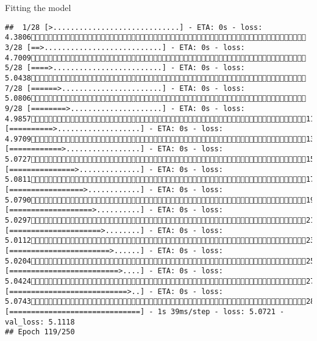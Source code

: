 \documentclass[
  ignorenonframetext,
]{beamer}
\begin{document}
\begin{frame}[fragile]{Fitting the model}
\begin{verbatim}
##  1/28 [>.............................] - ETA: 0s - loss: 4.3806 3/28 [==>...........................] - ETA: 0s - loss: 4.7009 5/28 [====>.........................] - ETA: 0s - loss: 5.0438 7/28 [======>.......................] - ETA: 0s - loss: 5.0806 9/28 [========>.....................] - ETA: 0s - loss: 4.985711/28 [==========>...................] - ETA: 0s - loss: 4.970913/28 [============>.................] - ETA: 0s - loss: 5.072715/28 [===============>..............] - ETA: 0s - loss: 5.081117/28 [=================>............] - ETA: 0s - loss: 5.079019/28 [===================>..........] - ETA: 0s - loss: 5.029721/28 [=====================>........] - ETA: 0s - loss: 5.011223/28 [=======================>......] - ETA: 0s - loss: 5.020425/28 [=========================>....] - ETA: 0s - loss: 5.042427/28 [===========================>..] - ETA: 0s - loss: 5.074328/28 [==============================] - 1s 39ms/step - loss: 5.0721 - val_loss: 5.1118
## Epoch 119/250

\end{verbatim}
\end{frame}
\end{document}

